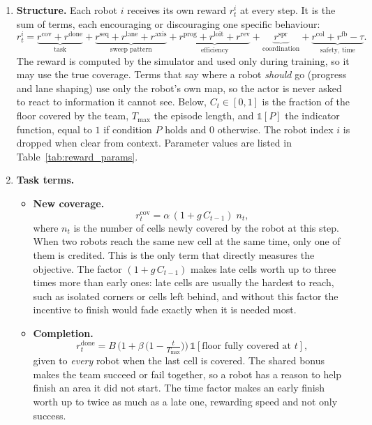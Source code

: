 \documentclass[11pt,a4paper]{article}
\begin{document}
\begin{enumerate}[label=\textbf{\arabic*.},resume]

\item \textbf{Structure.}
Each robot $i$ receives its own reward $r_t^i$ at every step. It is the sum
of terms, each encouraging or discouraging one specific behaviour:
\[
  r_t^i =
  \underbrace{r^{\mathrm{cov}} + r^{\mathrm{done}}}_{\text{task}}
  + \underbrace{r^{\mathrm{seq}} + r^{\mathrm{lane}} + r^{\mathrm{axis}}}_{\text{sweep pattern}}
  + \underbrace{r^{\mathrm{prog}} + r^{\mathrm{loit}} + r^{\mathrm{rev}}}_{\text{efficiency}}
  + \underbrace{r^{\mathrm{spr}}}_{\text{coordination}}
  + \underbrace{r^{\mathrm{col}} + r^{\mathrm{fb}} - \tau}_{\text{safety, time}} .
\]
The reward is computed by the simulator and used only during training, so it
may use the true coverage. Terms that say where a robot \emph{should} go
(progress and lane shaping) use only the robot's own map, so the actor is
never asked to react to information it cannot see. Below, $C_t\in[0,1]$ is
the fraction of the floor covered by the team, $T_{\max}$ the episode length,
and $\mathbb{1}[P]$ the indicator function, equal to $1$ if condition $P$
holds and $0$ otherwise. The robot index $i$ is dropped when clear from
context. Parameter values are listed in Table~\ref{tab:reward_params}.

\item \textbf{Task terms.}
\begin{itemize}
 \item \textbf{New coverage.}
 \[
   r^{\mathrm{cov}}_t = \alpha\,(1 + g\,C_{t-1})\; n_t ,
 \]
 where $n_t$ is the number of cells newly covered by the robot at this step.
 When two robots reach the same new cell at the same time, only one of them
 is credited. This is the only term that directly measures the objective.
 The factor $(1+g\,C_{t-1})$ makes late cells worth up to three times more
 than early ones: late cells are usually the hardest to reach, such as
 isolated corners or cells left behind, and without this factor the
 incentive to finish would fade exactly when it is needed most.

 \item \textbf{Completion.}
 \[
   r^{\mathrm{done}}_t = B\,\Big(1 + \beta\,\big(1 - \tfrac{t}{T_{\max}}\big)\Big)\,
   \mathbb{1}[\text{floor fully covered at } t],
 \]
 given to \emph{every} robot when the last cell is covered. The shared bonus
 makes the team succeed or fail together, so a robot has a reason to help
 finish an area it did not start. The time factor makes an early finish worth
 up to twice as much as a late one, rewarding speed and not only success.
\end{itemize}


\end{enumerate}
\end{document}
